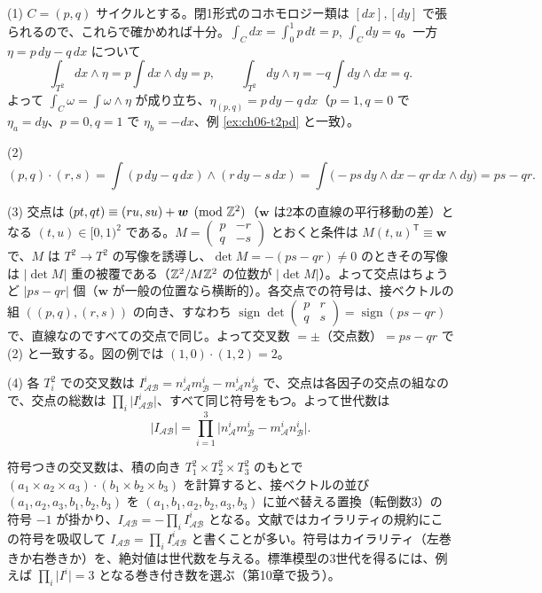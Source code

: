 \begin{solution}
(1) $C=(p,q)$ サイクルとする。閉1形式のコホモロジー類は $[dx],[dy]$ で張られるので、これらで確かめれば十分。$\int_C dx=\int_0^1p\,dt=p$, $\int_C dy=q$。一方 $\eta=p\,dy-q\,dx$ について
\[
\int_{T^2}dx\wedge\eta=p\int dx\wedge dy=p,\qquad\int_{T^2}dy\wedge\eta=-q\int dy\wedge dx=q .
\]
よって $\int_C\omega=\int\omega\wedge\eta$ が成り立ち、$\eta_{(p,q)}=p\,dy-q\,dx$（$p=1,q=0$ で $\eta_a=dy$、$p=0,q=1$ で $\eta_b=-dx$、例 \ref{ex:ch06-t2pd} と一致）。

(2)
\[
(p,q)\cdot(r,s)=\int(p\,dy-q\,dx)\wedge(r\,dy-s\,dx)=\int\bigl(-ps\,dy\wedge dx-qr\,dx\wedge dy\bigr)=ps-qr .
\]

(3) 交点は $(pt,qt)\equiv(ru,su)+\bm w\pmod{\mathbb{Z}^2}$（$\bm w$ は2本の直線の平行移動の差）となる $(t,u)\in[0,1)^2$ である。$M=\begin{pmatrix}p&-r\\q&-s\end{pmatrix}$ とおくと条件は $M(t,u)^{\mathsf T}\equiv\bm w$ で、$M$ は $T^2\to T^2$ の写像を誘導し、$\det M=-(ps-qr)\neq0$ のときその写像は $\lvert\det M\rvert$ 重の被覆である（$\mathbb{Z}^2/M\mathbb{Z}^2$ の位数が $\lvert\det M\rvert$）。よって交点はちょうど $\lvert ps-qr\rvert$ 個（$\bm w$ が一般の位置なら横断的）。各交点での符号は、接ベクトルの組 $((p,q),(r,s))$ の向き、すなわち $\operatorname{sign}\det\begin{pmatrix}p&r\\q&s\end{pmatrix}=\operatorname{sign}(ps-qr)$ で、直線なのですべての交点で同じ。よって交叉数 $=\pm$（交点数）$=ps-qr$ で (2) と一致する。図の例では $(1,0)\cdot(1,2)=2$。

(4) 各 $T^2_i$ での交叉数は $I^i_{\mathcal{AB}}=n^i_{\mathcal A}m^i_{\mathcal B}-m^i_{\mathcal A}n^i_{\mathcal B}$ で、交点は各因子の交点の組なので、交点の総数は $\prod_i\lvert I^i_{\mathcal{AB}}\rvert$、すべて同じ符号をもつ。よって世代数は
\[
\lvert I_{\mathcal{AB}}\rvert=\prod_{i=1}^3\bigl\lvert n^i_{\mathcal A}m^i_{\mathcal B}-m^i_{\mathcal A}n^i_{\mathcal B}\bigr\rvert .
\]
\begin{note}
符号つきの交叉数は、積の向き $T^2_1\times T^2_2\times T^2_3$ のもとで $(a_1\times a_2\times a_3)\cdot(b_1\times b_2\times b_3)$ を計算すると、接ベクトルの並び $(a_1,a_2,a_3,b_1,b_2,b_3)$ を $(a_1,b_1,a_2,b_2,a_3,b_3)$ に並べ替える置換（転倒数3）の符号 $-1$ が掛かり、$I_{\mathcal{AB}}=-\prod_iI^i_{\mathcal{AB}}$ となる。文献ではカイラリティの規約にこの符号を吸収して $I_{\mathcal{AB}}=\prod_iI^i_{\mathcal{AB}}$ と書くことが多い。符号はカイラリティ（左巻きか右巻きか）を、絶対値は世代数を与える。標準模型の3世代を得るには、例えば $\prod_i\lvert I^i\rvert=3$ となる巻き付き数を選ぶ（第10章で扱う）。
\end{note}
\end{solution}

